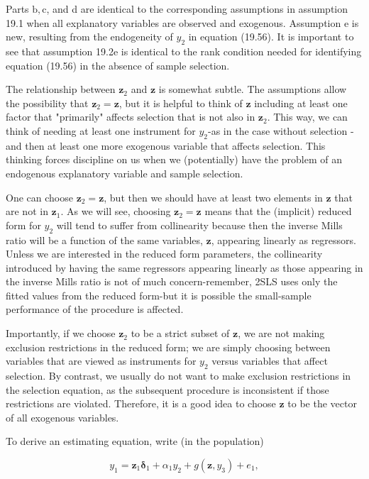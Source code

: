 \documentclass[10pt]{article}
\begin{document}
Parts $\mathrm{b}, \mathrm{c}$, and d are identical to the corresponding assumptions in assumption 19.1 when all explanatory variables are observed and exogenous. Assumption e is new, resulting from the endogeneity of $y_{2}$ in equation (19.56). It is important to see that assumption 19.2e is identical to the rank condition needed for identifying equation (19.56) in the absence of sample selection.

The relationship between $\mathbf{z}_{2}$ and $\mathbf{z}$ is somewhat subtle. The assumptions allow the possibility that $\mathbf{z}_{2}=\mathbf{z}$, but it is helpful to think of $\mathbf{z}$ including at least one factor that "primarily" affects selection that is not also in $\mathbf{z}_{2}$. This way, we can think of needing at least one instrument for $y_{2}$-as in the case without selection - and then at least one more exogenous variable that affects selection. This thinking forces discipline on us when we (potentially) have the problem of an endogenous explanatory variable and sample selection.

One can choose $\mathbf{z}_{2}=\mathbf{z}$, but then we should have at least two elements in $\mathbf{z}$ that are not in $\mathbf{z}_{1}$. As we will see, choosing $\mathbf{z}_{2}=\mathbf{z}$ means that the (implicit) reduced form for $y_{2}$ will tend to suffer from collinearity because then the inverse Mills ratio will be a function of the same variables, $\mathbf{z}$, appearing linearly as regressors. Unless we are interested in the reduced form parameters, the collinearity introduced by having the same regressors appearing linearly as those appearing in the inverse Mills ratio is not of much concern-remember, 2SLS uses only the fitted values from the reduced form-but it is possible the small-sample performance of the procedure is affected.

Importantly, if we choose $\mathbf{z}_{2}$ to be a strict subset of $\mathbf{z}$, we are not making exclusion restrictions in the reduced form; we are simply choosing between variables that are viewed as instruments for $y_{2}$ versus variables that affect selection. By contrast, we usually do not want to make exclusion restrictions in the selection equation, as the subsequent procedure is inconsistent if those restrictions are violated. Therefore, it is a good idea to choose $\mathbf{z}$ to be the vector of all exogenous variables.

To derive an estimating equation, write (in the population)


\begin{equation*}
y_{1}=\mathbf{z}_{1} \boldsymbol{\delta}_{1}+\alpha_{1} y_{2}+g\left(\mathbf{z}, y_{3}\right)+e_{1}, \tag{19.59}
\end{equation*}
\end{document}
